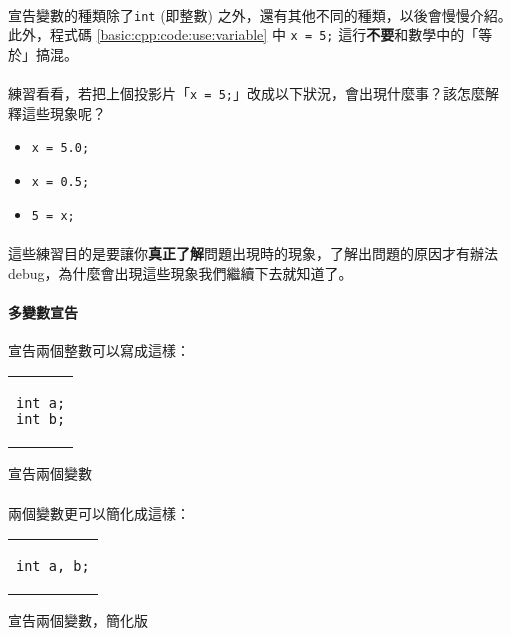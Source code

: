 \documentclass[12pt,a4paper,oneside]{article}
\begin{document}
\begin{CJK}{UTF8}{bkai}
\paragraph{}宣告變數的種類除了\lstinline!int! (即整數) 之外，還有其他不同的種類，以後會慢慢介紹。此外，程式碼 \ref{basic:cpp:code:use:variable} 中 \lstinline!x = 5;! 這行\textbf{不要}和數學中的「等於」搞混。
  
\paragraph{}練習看看，若把上個投影片「\lstinline!x = 5;!」改成以下狀況，會出現什麼事？該怎麼解釋這些現象呢？
\begin{itemize}
\item \lstinline!x = 5.0;!
\item \lstinline!x = 0.5;!
\item \lstinline!5 = x;!
\end{itemize}

\paragraph{}這些練習目的是要讓你\textbf{真正了解}問題出現時的現象，了解出問題的原因才有辦法 debug，為什麼會出現這些現象我們繼續下去就知道了。

\paragraph{多變數宣告}宣告兩個整數可以寫成這樣：
\begin{code}[h!]
\centering
\begin{tabular}{c}
\begin{lstlisting}
int a;
int b;
\end{lstlisting}
\end{tabular}
\caption{宣告兩個變數}
\label{basic:cpp:code:two:declare}
\end{code}

\paragraph{}兩個變數更可以簡化成這樣：
\begin{code}[h!]
\centering
\begin{tabular}{c}
\begin{lstlisting}
int a, b;
\end{lstlisting}
\end{tabular}
\caption{宣告兩個變數，簡化版}
\label{basic:cpp:code:two:declare:abbr}
\end{code}


\end{CJK}
\end{document}
